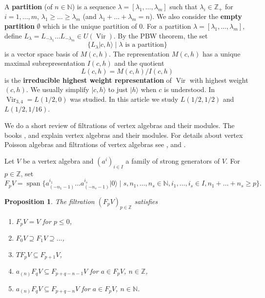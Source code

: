 \documentclass[12pt, a4paper]{article}
\newtheorem{proposition}[theorem]{Proposition}
\theoremstyle{remark}
\DeclareMathOperator{\Vir}{Vir}
\DeclareMathOperator{\vspan}{span}
\newcommand{\vac}{|0\rangle}
\begin{document}
A \textbf{partition} (of $n \in \mathbb{N}$) is a sequence $\lambda=[\lambda_1, \dots, \lambda_m]$ such that $\lambda_i \in \mathbb{Z}_+$ for $i=1, \dots, m$, $\lambda_1 \ge \dots \ge \lambda_m$ (and $\lambda_1 + \dots + \lambda_m = n$).
We also consider the \textbf{empty partition} $\emptyset$ which is the unique partition of $0$.
For a partition $\lambda = [\lambda_1, \dots, \lambda_m]$, define $L_{\lambda} = L_{-\lambda_1}\dots L_{-\lambda_m} \in U(\Vir)$.
By the PBW theorem, the set
\begin{equation*}
  \{L_\lambda|c,h\rangle \mid \lambda\text{ is a partition}\}
\end{equation*}
is a vector space basis of $M(c, h)$.
The representation $M(c, h)$ has a unique maximal subrepresentation $I(c, h)$ and the quotient
\begin{equation*}
  L(c, h)=M(c, h)/I(c, h)
\end{equation*}
is the \textbf{irreducible highest weight representation} of $\Vir$ with highest weight $(c, h)$.
We usually simplify $|c, h\rangle$ to just $|h\rangle$ when $c$ is understood.
In \cite{andrews_singular_2022} $\Vir_{3, 4}=L(1/2, 0)$ was studied.
In this article we study $L(1/2, 1/2)$ and $L(1/2, 1/16)$.

We do a short review of filtrations of vertex algebras and their modules.
The books \cite{kac_vertex_1998}, \cite{frenkel_vertex_2001} and \cite{lepowsky_introduction_2004} explain vertex algebras and their modules.
For details about vertex Poisson algebras and filtrations of vertex algebras see \cite{li_vertex_2004}, \cite{li_abelianizing_2005} and \cite{arakawa_remark_2012}.

Let $V$ be a vertex algebra and $(a^i)_{i \in I}$ a family of strong generators of $V$.
For $p \in \mathbb{Z}$, set
\begin{equation*}
  F_pV = \vspan\{a^{i_1}_{(-n_1 - 1)}\dots a^{i_s}_{(-n_s - 1)}\vac \mid s, n_1, \dots, n_s \in \mathbb{N}, i_1, \dots, i_s \in I, n_1 + \dots + n_s \ge p\}.
\end{equation*}

\begin{proposition}
  \label{prp:1}
  The filtration $(F_pV)_{p\in \mathbb{Z}}$ satisfies
  \begin{enumerate}[label={(\alph*)}]
  \item $F_pV = V$ for $p \le 0$,
  \item $F_0V \supseteq F_1V \supseteq \dots$,
  \item $TF_pV \subseteq F_{p+1}V$,
  \item $a_{(n)}F_qV \subseteq F_{p + q - n - 1}V$ for $a \in F_pV$, $n \in \mathbb{Z}$,
  \item $a_{(n)}F_qV \subseteq F_{p + q - n}V$ for $a \in F_pV$, $n \in \mathbb{N}$.
  \end{enumerate}
\end{proposition}
\end{document}
